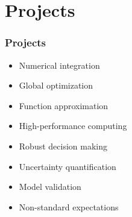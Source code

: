 \section{Projects}
\begin{frame}\frametitle{Projects}

	\begin{multicols}{2}
	\vspace{0.3cm}
	\begin{itemize}\setlength\itemsep{1em}
    \item Numerical integration
    \item Global optimization
    \item Function approximation
    \item High-performance computing
	\end{itemize}

	\pause

  \vspace{0.3cm}
	\begin{itemize}\setlength\itemsep{1em}
    \item Robust decision making
    \item Uncertainty quantification
    \item Model validation
    \item Non-standard expectations
	\end{itemize}
	\end{multicols}

\end{frame}
